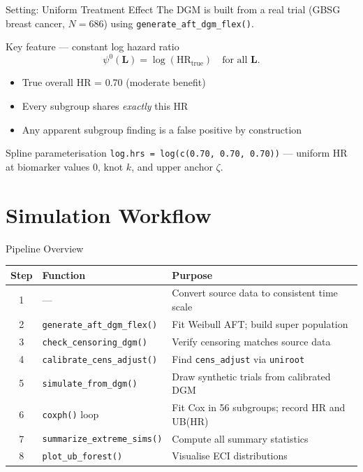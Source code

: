 \documentclass[
  11pt,
  ignorenonframetext,
  aspectratio=169,
]{beamer}
\providecommand{\tightlist}{%
  \setlength{\itemsep}{0pt}\setlength{\parskip}{0pt}}
\begin{document}
\begin{frame}[fragile]{Setting: Uniform Treatment Effect}
\label{setting-uniform-treatment-effect}
The DGM is built from a real trial (GBSG breast cancer, \(N = 686\))
using \texttt{generate\_aft\_dgm\_flex()}.

\begin{block}{Key feature --- constant log hazard ratio}
$$\psi^{0}(\mathbf{L}) = \log(\mathrm{HR}_{\mathrm{true}}) \quad \text{for all } \mathbf{L}.$$
\end{block}

\begin{itemize}
\tightlist
\item
  True overall HR = 0.70 (moderate benefit)
\item
  Every subgroup shares \emph{exactly} this HR
\item
  Any apparent subgroup finding is a false positive by construction
\end{itemize}

\begin{exampleblock}{Spline parameterisation}
\texttt{log.hrs = log(c(0.70, 0.70, 0.70))} --- uniform HR at biomarker
values $0$, knot $k$, and upper anchor $\zeta$.
\end{exampleblock}
\end{frame}

\section{Simulation Workflow}\label{simulation-workflow}

\begin{frame}{Pipeline Overview}
\label{pipeline-overview}
\small
\begin{center}
\begin{tabular}{clp{7cm}}
\toprule
\textbf{Step} & \textbf{Function} & \textbf{Purpose} \\
\midrule
1 & --- & Convert source data to consistent time scale \\
2 & \texttt{generate\_aft\_dgm\_flex()} & Fit Weibull AFT; build super population \\
3 & \texttt{check\_censoring\_dgm()} & Verify censoring matches source data \\
4 & \texttt{calibrate\_cens\_adjust()} & Find \texttt{cens\_adjust} via \texttt{uniroot} \\
5 & \texttt{simulate\_from\_dgm()} & Draw synthetic trials from calibrated DGM \\
6 & \texttt{coxph()} loop & Fit Cox in 56 subgroups; record HR and UB(HR) \\
7 & \texttt{summarize\_extreme\_sims()} & Compute all summary statistics \\
8 & \texttt{plot\_ub\_forest()} & Visualise ECI distributions \\
\bottomrule
\end{tabular}
\end{center}
\end{frame}
\end{document}
